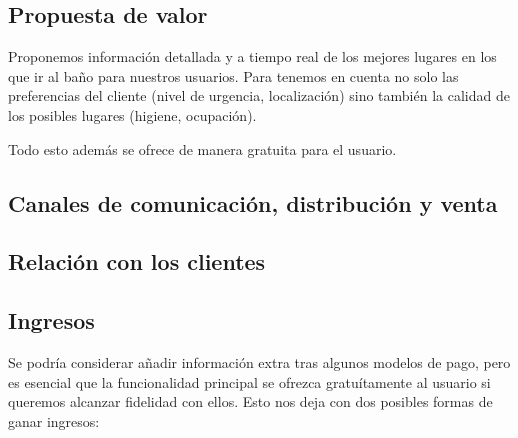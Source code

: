 \subsection{Propuesta de valor}


Proponemos información detallada y a tiempo real de los mejores lugares en los que ir al baño para nuestros usuarios. Para tenemos en cuenta no solo las preferencias del cliente (nivel de urgencia, localización) sino también la calidad de los posibles lugares (higiene, ocupación).

Todo esto además se ofrece de manera gratuita para el usuario.

\subsection{Canales de comunicación, distribución y venta}




\subsection{Relación con los clientes}


\subsection{Ingresos}


Se podría considerar añadir información extra tras algunos modelos de pago, pero es esencial que la funcionalidad principal se ofrezca gratuítamente al usuario si queremos alcanzar fidelidad con ellos. Esto nos deja con dos posibles formas de ganar ingresos:

